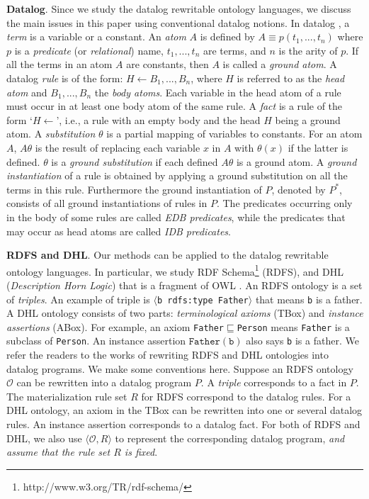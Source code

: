 \documentclass{article}
\begin{document}
\textbf{Datalog}. Since we study the datalog rewritable ontology
languages, we discuss the main issues in this paper using
conventional datalog notions.
In datalog \cite{database}, a \emph{term} is a variable or a constant. An \emph{atom} $A$ is defined by $A\equiv p(t_1,...,t_n)$ where $p$ is a \emph{predicate} (or \emph{relational}) name, $t_1,...,t_n$ are terms, and $n$ is the arity of $p$. If all the terms in an atom $A$ are constants, then $A$ is called a \emph{ground atom}.
A datalog \emph{rule} is of the form: $ H\leftarrow B_1,...,B_n$, where $H$ is referred to as the \emph{head atom} and $B_1,...,B_n$ the \emph{body atoms}. Each variable in the head atom of a rule must occur in at least one body atom of the same rule. A \emph{fact} is a rule of the form `$H\leftarrow$', i.e., a rule with an empty body and the head $H$ being a ground atom.
A \emph{substitution} $\theta$ is a partial mapping of variables to constants. For an atom $A$, $A\theta$ is the result of replacing each variable $x$ in $A$ with $\theta(x)$ if the latter is defined. $\theta$ is a \emph{ground substitution} if each defined $A\theta$ is a ground atom. A \emph{ground instantiation} of a rule is obtained by applying a ground substitution on all the terms in this rule. Furthermore the ground instantiation of $P$, denoted by $P^*$, consists of all ground instantiations of rules in $P$. The predicates occurring only in the body of some rules are called \emph{EDB predicates}, while the predicates that may occur as head atoms are called \emph{IDB predicates}.

\textbf{RDFS and DHL}. Our methods can be applied to the datalog rewritable ontology languages. In particular, we study RDF Schema\footnote{http://www.w3.org/TR/rdf-schema/} (RDFS), and DHL (\emph{Description Horn Logic}) that is a fragment of OWL \cite{DBLP:conf/www/GrosofHVD03}. An RDFS ontology is a set of \emph{triples}. An example of triple is
$\langle$\texttt{b rdfs:type Father}$\rangle$ that means \texttt{b} is a father. A DHL ontology consists of two parts: \emph{terminological axioms} (TBox) and \emph{instance assertions} (ABox). For example, an axiom \texttt{Father$\sqsubseteq$Person} means \texttt{Father} is a subclass of \texttt{Person}. An instance assertion $\texttt{Father}(\texttt{b})$ also says \texttt{b} is a father.
We refer the readers to the works \cite{DBLP:conf/www/GrosofHVD03,DBLP:conf/www/HorrocksP04} of rewriting RDFS and DHL ontologies into datalog programs. We make some conventions here. Suppose an RDFS ontology $\mathcal{O}$
can be rewritten into a datalog program $P$. A \emph{triple} corresponds to a fact in $P$. The materialization rule set $R$ for RDFS correspond to the datalog rules. For a DHL ontology, an axiom in the TBox can be rewritten into one or several datalog rules. An instance assertion corresponds to a datalog fact.
For both of RDFS and DHL, we also use $\langle\mathcal{O}, R\rangle$ to represent the corresponding datalog program, \emph{and assume that the rule set $R$ is fixed}.
\end{document}
